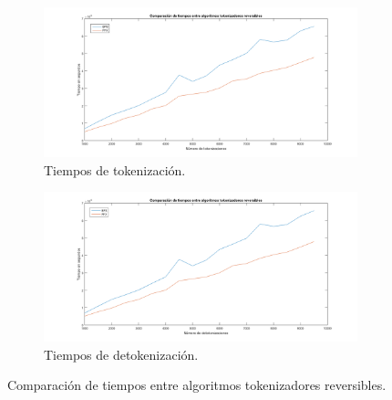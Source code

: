 \begin{figure}
  \centering
  \begin{subfigure}{1\textwidth}
    \begin{center}
      \includegraphics[width=1\linewidth]{diagramas/tok_rev}
      \caption{Tiempos de tokenización.}
    \end{center}
  \end{subfigure}
  \begin{subfigure}{0.9\textwidth}
    \begin{center}
      \includegraphics[width=1\linewidth]{diagramas/detok_rev}
      \caption{Tiempos de detokenización.}
    \end{center}
  \end{subfigure}
  \caption{Comparación de tiempos entre algoritmos tokenizadores reversibles.}
  \label{figura:tok_rev}
\end{figure}

